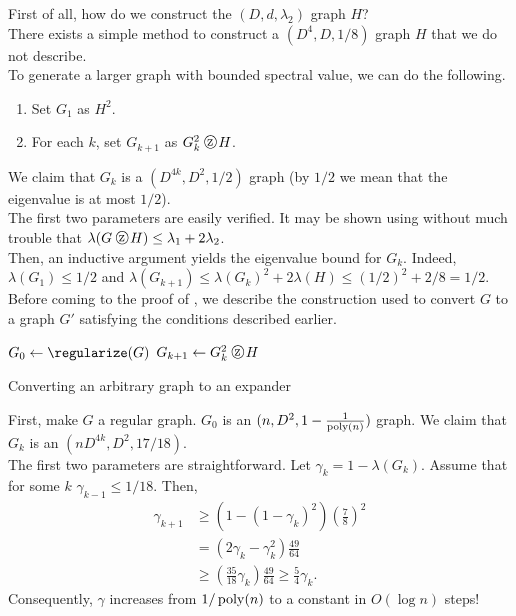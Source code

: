 			First of all, how do we construct the $(D,d,\lambda_2)$ graph $H$?\\
			There exists a simple method to construct a $(D^4,D,1/8)$ graph $H$ that we do not describe.\\
			To generate a larger graph with bounded spectral value, we can do the following.
			\begin{enumerate}
				\item Set $G_1$ as $H^2$.
				\item For each $k$, set $G_{k+1}$ as $G_k^2 \zigzag H$.
			\end{enumerate}
			We claim that $G_k$ is a $(D^{4k},D^2,1/2)$ graph (by $1/2$ we mean that the eigenvalue is at most $1/2$).\\
			The first two parameters are easily verified.
			It may be shown using  without much trouble that $\lambda(G \zigzag H) \le \lambda_1 + 2\lambda_2$.\\
			Then, an inductive argument yields the eigenvalue bound for $G_k$. Indeed, $\lambda(G_1) \le 1/2$ and $\lambda(G_{k+1}) \le \lambda(G_k)^2 + 2 \lambda(H) \le (1/2)^2 + 2/8 = 1/2$.
			Before coming to the proof of , we describe the construction used to convert $G$ to a graph $G'$ satisfying the conditions described earlier.\\
			\begin{algorithm}[H]
				\DontPrintSemicolon
				\SetNoFillComment
				$G_0 \gets \regularize(G)$\;
				 {
					$G_{k+1} \gets G_k^2 \zigzag H$
				}
				\caption{Converting an arbitrary graph to an expander}
			\end{algorithm}
			First, make $G$ a regular graph. %
			$G_0$ is an $(n,D^2,1-\frac{1}{\operatorname{poly}(n)})$ graph.
			We claim that $G_k$ is an $(nD^{4k},D^2,17/18)$.\\
			The first two parameters are straightforward. Let $\gamma_k = 1 - \lambda(G_k)$. Assume that for some $k$ $\gamma_{k-1} \le 1/18$. Then,
			\begin{align*}
				\gamma_{k+1} &\ge \left(1 - \left(1 - \gamma_k\right)^2\right) \left( \frac{7}{8} \right)^2 \\
					&= (2\gamma_k - \gamma_k^2) \frac{49}{64} \\
					&\ge \left( \frac{35}{18} \gamma_k \right) \frac{49}{64} \ge \frac{5}{4} \gamma_k.
			\end{align*}
			Consequently, $\gamma$ increases from $1/\operatorname{poly}(n)$ to a constant in $O(\log n)$ steps!

